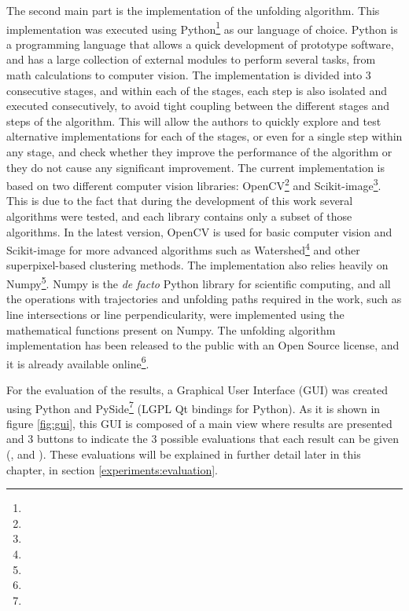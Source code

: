 The second main part is the implementation of the unfolding algorithm. This implementation was executed using Python\footnote{} as our language of choice. Python is a programming language that allows a quick development of prototype software, and has a large collection of external modules to perform several tasks, from math calculations to computer vision. The implementation is divided into 3 consecutive stages, and within each of the stages, each step is also isolated and executed consecutively, to avoid tight coupling between the different stages and steps of the algorithm. This will allow the authors to quickly explore and test alternative implementations for each of the stages, or even for a single step within any stage, and check whether they improve the performance of the algorithm or they do not cause any significant improvement. The current implementation is based on two different computer vision libraries: OpenCV\footnote{} and Scikit-image\footnote{}. This is due to the fact that during the development of this work several algorithms were tested, and each library contains only a subset of those algorithms. In the latest version, OpenCV is used for basic computer vision and Scikit-image for more advanced algorithms such as Watershed\footnote{} and other superpixel-based clustering methods. The implementation also relies heavily on Numpy\footnote{}. Numpy is the \textit{de facto} Python library for scientific computing, and all the operations with trajectories and unfolding paths required in the work, such as line intersections or line perpendicularity, were implemented using the mathematical functions present on Numpy. The unfolding algorithm implementation has been released to the public with an Open Source license, and it is already available online\footnote{}.


For the evaluation of the results, a Graphical User Interface (GUI) was created using Python and PySide\footnote{} (LGPL Qt bindings for Python). As it is shown in figure \ref{fig:gui}, this GUI is composed of a main view where results are presented and 3 buttons to indicate the 3 possible evaluations that each result can be given (\fail{}, \good{} and \great{}). These evaluations will be explained in further detail later in this chapter, in section \ref{experiments:evaluation}. 

